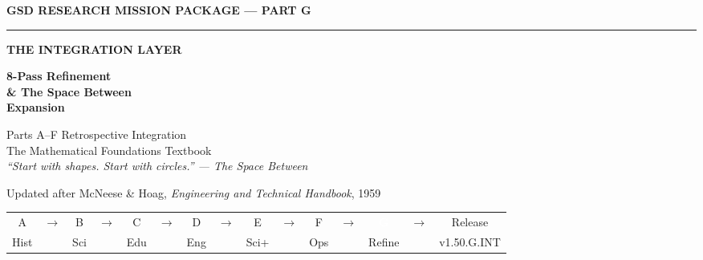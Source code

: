 \documentclass[11pt,letterpaper]{article}
\begin{document}
\thispagestyle{empty}
\begin{center}
\vspace*{1.5cm}

{\small\sffamily\textcolor{primary}{\textbf{GSD RESEARCH MISSION PACKAGE --- PART G}}}

\vspace{0.3cm}
\textcolor{bordergray}{\rule{10cm}{0.4pt}}

\vspace{1cm}
{\fontsize{10}{13}\selectfont\sffamily\textcolor{passgold}{\textbf{THE INTEGRATION LAYER}}}

\vspace{0.4cm}
{\fontsize{20}{26}\selectfont\bfseries\sffamily\textcolor{primary}{8-Pass Refinement\\[0.3em]\& The Space Between\\[0.3em]Expansion}}

\vspace{0.5cm}
{\large\sffamily\textcolor{secondary}{Parts A--F Retrospective Integration}}\\[0.3em]
{\normalsize\sffamily\textcolor{accent}{The Mathematical Foundations Textbook}}\\[0.2em]
{\normalsize\sffamily\textcolor{tspbgreen}{\textit{``Start with shapes. Start with circles.'' --- The Space Between}}}

\vspace{0.5cm}
{\normalsize\sffamily\textcolor{mcnhoag}{Updated after McNeese \& Hoag, \textit{Engineering and Technical Handbook}, 1959}}

\vspace{1.2cm}
\begin{center}
\scriptsize\sffamily
\begin{tabular}{ccccccccccccccc}
\textcolor{subtlegray}{A} & \textcolor{subtlegray}{$\to$} &
\textcolor{subtlegray}{B} & \textcolor{subtlegray}{$\to$} &
\textcolor{subtlegray}{C} & \textcolor{subtlegray}{$\to$} &
\textcolor{subtlegray}{D} & \textcolor{subtlegray}{$\to$} &
\textcolor{subtlegray}{E} & \textcolor{subtlegray}{$\to$} &
\textcolor{subtlegray}{F} & \textcolor{subtlegray}{$\to$} &
\colorbox{primary}{\textcolor{white}{\bfseries\ G\ }} &
\textcolor{subtlegray}{$\to$} &
\textcolor{subtlegray}{Release}\\[2pt]
{\tiny\textcolor{subtlegray}{Hist}} & &
{\tiny\textcolor{subtlegray}{Sci}} & &
{\tiny\textcolor{subtlegray}{Edu}} & &
{\tiny\textcolor{subtlegray}{Eng}} & &
{\tiny\textcolor{subtlegray}{Sci+}} & &
{\tiny\textcolor{subtlegray}{Ops}} & &
{\tiny\textcolor{subtlegray}{Refine}} & &
{\tiny\textcolor{subtlegray}{v1.50.G.INT}}
\end{tabular}
\end{center}


\end{center}
\end{document}
